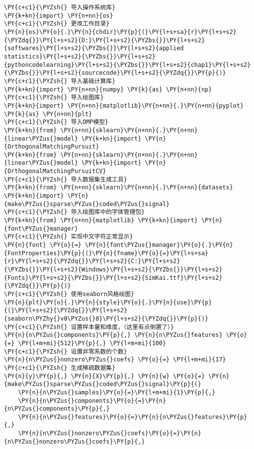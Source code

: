 \begin{Verbatim}[commandchars=\\\{\}]
\PY{c+c1}{\PYZsh{} 导入操作系统库}
\PY{k+kn}{import} \PY{n+nn}{os}
\PY{c+c1}{\PYZsh{} 更改工作目录}
\PY{n}{os}\PY{o}{.}\PY{n}{chdir}\PY{p}{(}\PY{l+s+sa}{r}\PY{l+s+s2}{\PYZdq{}}\PY{l+s+s2}{D:}\PY{l+s+s2}{\PYZbs{}}\PY{l+s+s2}{softwares}\PY{l+s+s2}{\PYZbs{}}\PY{l+s+s2}{applied statistics}\PY{l+s+s2}{\PYZbs{}}\PY{l+s+s2}{pythoncodelearning}\PY{l+s+s2}{\PYZbs{}}\PY{l+s+s2}{chap1}\PY{l+s+s2}{\PYZbs{}}\PY{l+s+s2}{sourcecode}\PY{l+s+s2}{\PYZdq{}}\PY{p}{)}
\PY{c+c1}{\PYZsh{} 导入基础计算库}
\PY{k+kn}{import} \PY{n+nn}{numpy} \PY{k}{as} \PY{n+nn}{np}
\PY{c+c1}{\PYZsh{} 导入绘图库}
\PY{k+kn}{import} \PY{n+nn}{matplotlib}\PY{n+nn}{.}\PY{n+nn}{pyplot} \PY{k}{as} \PY{n+nn}{plt}
\PY{c+c1}{\PYZsh{} 导入OMP模型}
\PY{k+kn}{from} \PY{n+nn}{sklearn}\PY{n+nn}{.}\PY{n+nn}{linear\PYZus{}model} \PY{k+kn}{import} \PY{n}{OrthogonalMatchingPursuit}
\PY{k+kn}{from} \PY{n+nn}{sklearn}\PY{n+nn}{.}\PY{n+nn}{linear\PYZus{}model} \PY{k+kn}{import} \PY{n}{OrthogonalMatchingPursuitCV}
\PY{c+c1}{\PYZsh{} 导入数据集生成工具}
\PY{k+kn}{from} \PY{n+nn}{sklearn}\PY{n+nn}{.}\PY{n+nn}{datasets} \PY{k+kn}{import} \PY{n}{make\PYZus{}sparse\PYZus{}coded\PYZus{}signal}
\PY{c+c1}{\PYZsh{} 导入绘图库中的字体管理包}
\PY{k+kn}{from} \PY{n+nn}{matplotlib} \PY{k+kn}{import} \PY{n}{font\PYZus{}manager}
\PY{c+c1}{\PYZsh{} 实现中文字符正常显示}
\PY{n}{font} \PY{o}{=} \PY{n}{font\PYZus{}manager}\PY{o}{.}\PY{n}{FontProperties}\PY{p}{(}\PY{n}{fname}\PY{o}{=}\PY{l+s+sa}{r}\PY{l+s+s2}{\PYZdq{}}\PY{l+s+s2}{C:}\PY{l+s+s2}{\PYZbs{}}\PY{l+s+s2}{Windows}\PY{l+s+s2}{\PYZbs{}}\PY{l+s+s2}{Fonts}\PY{l+s+s2}{\PYZbs{}}\PY{l+s+s2}{SimKai.ttf}\PY{l+s+s2}{\PYZdq{}}\PY{p}{)}
\PY{c+c1}{\PYZsh{} 使用seaborn风格绘图}
\PY{n}{plt}\PY{o}{.}\PY{n}{style}\PY{o}{.}\PY{n}{use}\PY{p}{(}\PY{l+s+s2}{\PYZdq{}}\PY{l+s+s2}{seaborn\PYZhy{}v0\PYZus{}8}\PY{l+s+s2}{\PYZdq{}}\PY{p}{)}
\PY{c+c1}{\PYZsh{} 设置样本量和维度，（这里有点倒置了）}
\PY{n}{n\PYZus{}components}\PY{p}{,} \PY{n}{n\PYZus{}features} \PY{o}{=} \PY{l+m+mi}{512}\PY{p}{,} \PY{l+m+mi}{100}
\PY{c+c1}{\PYZsh{} 设置非零系数的个数}
\PY{n}{n\PYZus{}nonzero\PYZus{}coefs} \PY{o}{=} \PY{l+m+mi}{17}
\PY{c+c1}{\PYZsh{} 生成稀疏数据集}
\PY{n}{y}\PY{p}{,} \PY{n}{X}\PY{p}{,} \PY{n}{w} \PY{o}{=} \PY{n}{make\PYZus{}sparse\PYZus{}coded\PYZus{}signal}\PY{p}{(}
    \PY{n}{n\PYZus{}samples}\PY{o}{=}\PY{l+m+mi}{1}\PY{p}{,}
    \PY{n}{n\PYZus{}components}\PY{o}{=}\PY{n}{n\PYZus{}components}\PY{p}{,}
    \PY{n}{n\PYZus{}features}\PY{o}{=}\PY{n}{n\PYZus{}features}\PY{p}{,}
    \PY{n}{n\PYZus{}nonzero\PYZus{}coefs}\PY{o}{=}\PY{n}{n\PYZus{}nonzero\PYZus{}coefs}\PY{p}{,}

\end{Verbatim}
